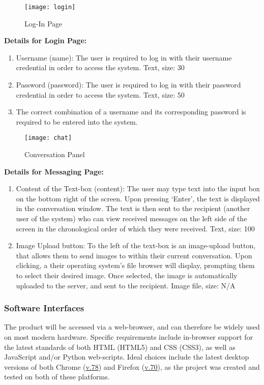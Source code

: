 \documentclass[11pt]{article}
\begin{document}
\begin{figure}[!htb]
  \centering
  \texttt{[image: login]}
  \caption{Log-In Page}
\end{figure}

\noindent \textbf{Details for Login Page:}
\begin{enumerate}
    \item Username (name): The user is required to log in with their username credential in order to
        access the system. Text, size: 30
    \item Password (password): The user is required to log in with their password credential in
        order to access the system. Text, size: 50
    \item The correct combination of a username and its corresponding password is required to be
        entered into the system.
\end{enumerate}

\begin{figure}
    \centering
    \texttt{[image: chat]}
    \caption{Conversation Panel}
\end{figure}
\pagebreak

\noindent \textbf{Details for Messaging Page:}
\begin{enumerate}
    \item Content of the Text-box (content): The user may type text into the input box on the bottom
        right of the screen. Upon pressing `Enter', the text is displayed in the conversation
        window. The text is then sent to the recipient (another user of the system) who can view
        received messages on the left side of the screen in the chronological order of which they
        were received. Text, size: 100
    \item Image Upload button: To the left of the text-box is an image-upload button, that allows
        them to send images to within their current conversation. Upon clicking, a their operating
        system's file browser will display, prompting them to select their desired image. Once
        selected, the image is automatically uploaded to the server, and sent to the recipient.
        Image file, size: N/A
\end{enumerate}
\FloatBarrier

\subsubsection{Software Interfaces}
The product will be accessed via a web-browser, and can therefore be widely used on most modern
hardware. Specific requirements include in-browser support for the latest standards of both HTML
(HTML5) and CSS (CSS3), as well as JavaScript and/or Python web-scripts. Ideal choices include the
latest desktop versions of both Chrome (\url{v.78}) and Firefox (\url{v.70}), as the project was
created and tested on both of these platforms.
\end{document}
